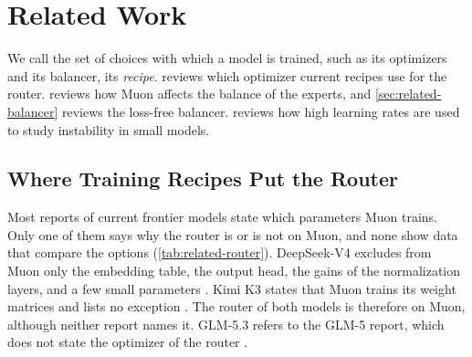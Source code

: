 \chapter{Related Work}
\label{sec:related-work}

We call the set of choices with which a model is trained, such as its optimizers and its balancer, its \emph{recipe}.  reviews which optimizer current recipes use for the router.  reviews how Muon affects the balance of the experts, and \cref{sec:related-balancer} reviews the loss-free balancer.  reviews how high learning rates are used to study instability in small models.

\section{Where Training Recipes Put the Router}
\label{sec:related-router}
Most reports of current frontier models state which parameters Muon trains. Only one of them says why the router is or is not on Muon, and none show data that compare the options (\cref{tab:related-router}). DeepSeek-V4 excludes from Muon only the embedding table, the output head, the gains of the normalization layers, and a few small parameters \cite{deepseek2026v4}. Kimi K3 states that Muon trains its weight matrices and lists no exception \cite{kimi2026k3}. The router of both models is therefore on Muon, although neither report names it. GLM-5.3 refers to the GLM-5 report, which does not state the optimizer of the router \cite{glm2026glm5, zai2026glm53}.

